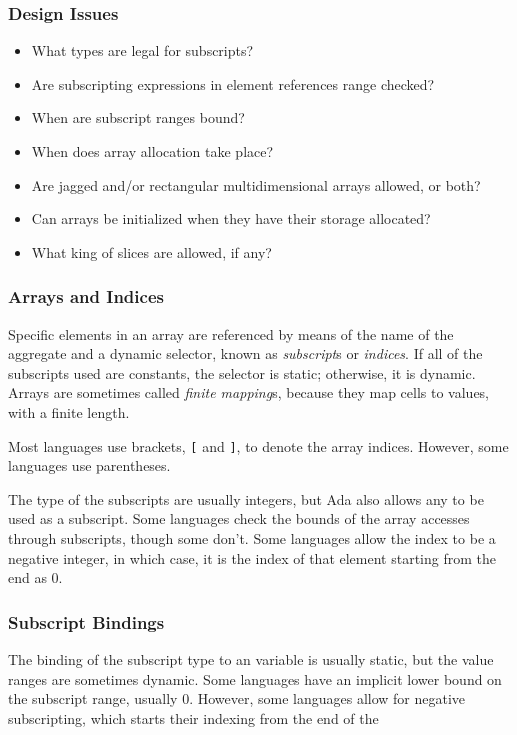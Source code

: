 \subsubsection{Design Issues}\label{subsubsec:Arrays-Design_Issues}
\begin{itemize}[noitemsep]
\item What types are legal for subscripts?
\item Are subscripting expressions in element references range checked?
\item When are subscript ranges bound?
\item When does array allocation take place?
\item Are jagged and/or rectangular multidimensional arrays allowed, or both?
\item Can arrays be initialized when they have their storage allocated?
\item What king of slices are allowed, if any?
\end{itemize}

\subsubsection{Arrays and Indices}\label{subsubsec:Arrays-Arrays_and_Indices}
Specific elements in an array are referenced by means of the name of the aggregate and a dynamic selector, known as \emph{subscript}s or \emph{indices}.
If all of the subscripts used are constants, the selector is static; otherwise, it is dynamic.
Arrays are sometimes called \emph{finite mapping}s, because they map  cells to values, with a finite length.

Most languages use brackets, \texttt{[} and \texttt{]}, to denote the array indices.
However, some languages use parentheses.

The type of the subscripts are usually integers, but Ada also allows any  to be used as a subscript.
Some languages check the bounds of the array accesses through subscripts, though some don't.
Some languages allow the index to be a negative integer, in which case, it is the index of that element starting from the end as 0.

\subsubsection{Subscript Bindings}\label{subsubsec:Arrays-Subscript_Bindings}
The binding of the subscript type to an  variable is usually static, but the value ranges are sometimes dynamic.
Some languages have an implicit lower bound on the subscript range, usually 0.
However, some languages allow for negative subscripting, which starts their indexing from the end of the 

